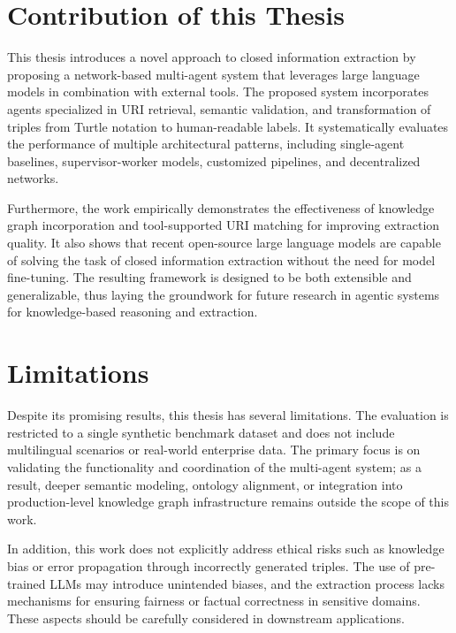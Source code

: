 \documentclass[a4paper,oneside,bibliography=totoc]{scrbook}
\begin{document}
\section{Contribution of this Thesis}
\label{sec:contribution}

This thesis introduces a novel approach to closed information extraction by proposing a network-based multi-agent system that leverages large language models in combination with external tools. The proposed system incorporates agents specialized in URI retrieval, semantic validation, and transformation of triples from Turtle notation to human-readable labels. It systematically evaluates the performance of multiple architectural patterns, including single-agent baselines, supervisor-worker models, customized pipelines, and decentralized networks.

Furthermore, the work empirically demonstrates the effectiveness of knowledge graph incorporation and tool-supported URI matching for improving extraction quality. It also shows that recent open-source large language models are capable of solving the task of closed information extraction without the need for model fine-tuning. The resulting framework is designed to be both extensible and generalizable, thus laying the groundwork for future research in agentic systems for knowledge-based reasoning and extraction.

\section{Limitations}
\label{sec:limitations}

Despite its promising results, this thesis has several limitations. The evaluation is restricted to a single synthetic benchmark dataset and does not include multilingual scenarios or real-world enterprise data. The primary focus is on validating the functionality and coordination of the multi-agent system; as a result, deeper semantic modeling, ontology alignment, or integration into production-level knowledge graph infrastructure remains outside the scope of this work.

In addition, this work does not explicitly address ethical risks such as knowledge bias or error propagation through incorrectly generated triples. The use of pre-trained \acp{LLM} may introduce unintended biases, and the extraction process lacks mechanisms for ensuring fairness or factual correctness in sensitive domains. These aspects should be carefully considered in downstream applications.
\end{document}
